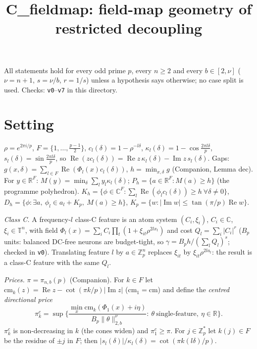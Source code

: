 \documentclass[11pt]{article}
\title{C\_fieldmap: field-map geometry of restricted decoupling}
\date{}
\theoremstyle{remark}
\newcommand{\Re}{\operatorname{Re}}
\newcommand{\Im}{\operatorname{Im}}
\renewcommand{\Re}{\operatorname{Re}}
\renewcommand{\Im}{\operatorname{Im}}
\begin{document}
\maketitle

\noindent All statements hold for every odd prime $p$, every $n\ge2$ and every $b\in[2,\nu]$ ($\nu=n+1$, $s=\nu/b$, $r=1/s$)
unless a hypothesis says otherwise; no case split is used.  Checks: \texttt{v0}--\texttt{v7} in this directory.

\section{Setting}
$\rho=e^{2\pi i/p}$, $F=\{1,\dots,\frac{p-1}2\}$, $c_l(\delta)=1-\rho^{-l\delta}$, $\kappa_l(\delta)=1-\cos\frac{2\pi l\delta}p$,
$s_l(\delta)=\sin\frac{2\pi l\delta}p$, so $\Re(zc_l(\delta))=\Re z\,\kappa_l(\delta)-\Im z\,s_l(\delta)$.
Gaps: $g(x,\delta)=\sum_{l\in F}\Re(\Phi_l(x)c_l(\delta))$, $h=\min_{x,\delta}g$ (Companion, Lemma dec).
For $y\in\mathbb R^F$: $M(y)=\min_{\delta}\sum_ly_l\kappa_l(\delta)$; $P_h=\{a\in\mathbb R^F:M(a)\ge h\}$ (the programme polyhedron).
$K_h=\{\phi\in\mathbb C^F:\sum_l\Re(\phi_lc_l(\delta))\ge h\ \forall\delta\ne0\}$,
$D_h=\{\phi:\exists a,\ \phi_l\in a_l+K_p,\ M(a)\ge h\}$, $K_p=\{w:|\Im w|\le\tan(\pi/p)\Re w\}$.

\emph{Class C.} A frequency-$l$ class-C feature is an atom system $(C_i,\xi_i)$, $C_i\in\mathbb C$, $\xi_i\in\mathbb T^n$, with field
$\Phi_l(x)=\sum_iC_i\prod_t(1+\xi_{it}\rho^{2lx_t})$ and cost $Q_l=\sum_i|C_i|^r$ ($B_p$ units: balanced DC-free neurons are
budget-tight, so $\gamma=B_ph/(\sum_lQ_l)^s$; checked in \texttt{v0}).  Translating feature $l$ by $a\in\mathbb Z_p^n$ replaces
$\xi_{it}$ by $\xi_{it}\rho^{2la_t}$: the result is a class-C feature with the same $Q_l$.

\emph{Prices.} $\pi=\pi_{n,b}(p)$ (Companion).  For $k\in F$ let $\mathrm{cm}_k(z)=\Re z-\cot(\pi k/p)|\Im z|$ ($\mathrm{cm}_1=\mathrm{cm}$)
and define the \emph{centred directional price}
\[\pi^c_k=\sup\Big\{\frac{\min_x\mathrm{cm}_k(\Phi_1(x)+i\eta)}{B_p\|\theta\|_{2,b}^\nu}:\ \theta\ \text{single-feature},\ \eta\in\mathbb R\Big\}.\]
$\pi^c_k$ is non-decreasing in $k$ (the cones widen) and $\pi^c_1\ge\pi$.  For $j\in\mathbb Z_p^*$ let $k(j)\in F$ be the residue of
$\pm j$ in $F$; then $|s_l(\delta)|/\kappa_l(\delta)=\cot(\pi k(l\delta)/p)$.
\end{document}
